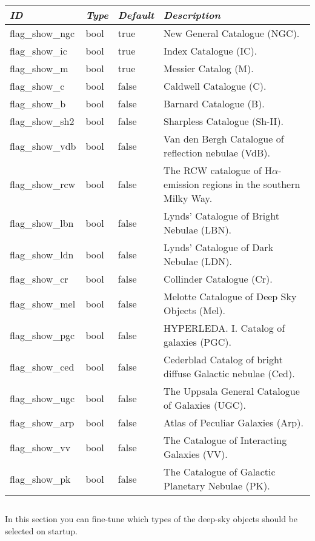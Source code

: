 \begin{longtabu} to \textwidth {l|l|l|X}\toprule
\emph{ID} & \emph{Type} & \emph{Default} & \emph{Description}\\\midrule
flag\_show\_ngc & bool & true  & New General Catalogue (NGC). \\\midrule
flag\_show\_ic  & bool & true  & Index Catalogue (IC). \\\midrule
flag\_show\_m   & bool & true  & Messier Catalog (M). \\\midrule
flag\_show\_c   & bool & false & Caldwell Catalogue (C). \\\midrule
flag\_show\_b   & bool & false & Barnard Catalogue (B). \\\midrule
flag\_show\_sh2 & bool & false & Sharpless Catalogue (Sh-II). \\\midrule
flag\_show\_vdb & bool & false & Van den Bergh Catalogue of reflection nebulae (VdB). \\\midrule
flag\_show\_rcw & bool & false & The RCW catalogue of H$\alpha$-emission regions in the southern Milky Way. \\\midrule
flag\_show\_lbn & bool & false & Lynds' Catalogue of Bright Nebulae (LBN). \\\midrule
flag\_show\_ldn & bool & false & Lynds' Catalogue of Dark Nebulae (LDN). \\\midrule
flag\_show\_cr  & bool & false & Collinder Catalogue (Cr). \\\midrule
flag\_show\_mel & bool & false & Melotte Catalogue of Deep Sky Objects (Mel).  \\\midrule
flag\_show\_pgc & bool & false & HYPERLEDA. I. Catalog of galaxies (PGC). \\\midrule
flag\_show\_ced & bool & false & Cederblad Catalog of bright diffuse Galactic nebulae (Ced). \\\midrule
flag\_show\_ugc & bool & false & The Uppsala General Catalogue of Galaxies (UGC). \\\midrule
flag\_show\_arp & bool & false & Atlas of Peculiar Galaxies (Arp). \\\midrule
flag\_show\_vv  & bool & false & The Catalogue of Interacting Galaxies (VV). \\\midrule
flag\_show\_pk  & bool & false & The Catalogue of Galactic Planetary Nebulae (PK). \\\bottomrule
\end{longtabu}

\subsection{}
\label{sec:config.ini:dso_type_filters}
In this section you can fine-tune which types of the deep-sky objects should be selected on startup.

